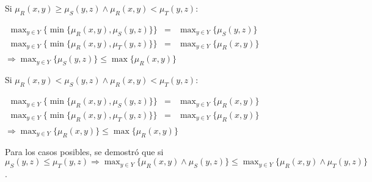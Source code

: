 \documentclass[letterpaper,spanish,11pt]{article}
\begin{document}
\begin{enumerate}
Si $\mu_{R}(x,y) \geq \mu_{S}(y,z) \wedge \mu_{R}(x,y) < \mu_{T}(y,z)$:

$\begin{array}{lll} 
\max_{y\in Y}\{\min\{\mu_{R}(x,y),\mu_{S}(y,z)\}\} &= &\max_{y\in Y}\{\mu_{S}(y,z)\}\\
\max_{y\in Y}\{\min\{ \mu_{R}(x,y),\mu_{T}(y,z)\}\} &= &\max_{y\in Y}\{\mu_{R}(x,y)\}\\
\end{array}$\\
$\Rightarrow \max_{y\in Y}\{\mu_{S}(y,z)\} \leq \max\{\mu_{R}(x,y)\}$


Si $\mu_{R}(x,y) < \mu_{S}(y,z) \wedge \mu_{R}(x,y)  <  \mu_{T}(y,z)$:

$\begin{array}{lll} 
\max_{y\in Y}\{\min\{\mu_{R}(x,y),\mu_{S}(y,z)\}\} &= &\max_{y\in Y}\{\mu_{R}(x,y)\}\\
\max_{y\in Y}\{\min\{ \mu_{R}(x,y),\mu_{T}(y,z)\}\} &= &\max_{y\in Y}\{\mu_{R}(x,y)\}\\
\end{array}$\\
$\Rightarrow \max_{y\in Y}\{\mu_{R}(x,y)\} \leq \max\{\mu_{R}(x,y)\}$

Para los casos posibles, se demostr\'{o} que si $\mu_{S}(y,z) \leq \mu_{T}(y,z) \Rightarrow \max_{y \in Y}\{ \mu_{R}(x,y) \wedge \mu_{S}(y,z) \} \leq \max_{y \in Y}\{ \mu_{R}(x,y) \wedge \mu_{T}(y,z)\}$.\\

\end{enumerate}




\end{document}
